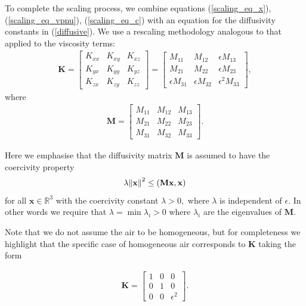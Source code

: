 \documentclass[12pt]{report}
\numberwithin{theorem}{chapter}
\numberwithin{corollary}{chapter}
\numberwithin{lemma}{chapter}
\numberwithin{remark}{chapter}
\numberwithin{definition}{chapter}
\numberwithin{prop}{chapter}
\begin{document}
To complete the scaling process, we combine equations (\ref{scaling_eq_x}), (\ref{scaling_eq_vpnu}), (\ref{scaling_eq_c}) with an equation for the diffusivity constants in (\ref{diffusive}). We use a rescaling methodology analogous to that applied to the viscosity terms:
%
\begin{gather}\label{scaling_eq_diffusion_gfc}
\mathbf{K}
=
 \begin{bmatrix} K_{xx} & K_{xy} & K_{xz} \\ K_{yx} & K_{yy} & K_{yz} \\ K_{zx} & K_{zy} & K_{zz} \end{bmatrix}
 =
  \begin{bmatrix}
    M_{11} & M_{12} & \epsilon M_{13} \\ M_{21} & M_{22} & \epsilon M_{23} \\ \epsilon M_{31} & \epsilon M_{32} & \epsilon^2 M_{33}
  \end{bmatrix},
\end{gather}
%
where
%
\begin{gather}
 \mathbf{M}
 =
  \begin{bmatrix}
    M_{11} & M_{12} & M_{13} \\ M_{21} & M_{22} & M_{23} \\ M_{31} & M_{32} & M_{33}
  \end{bmatrix}.
\end{gather}

Here we emphasise that the diffusivity matrix $\mathbf{M}$ is assumed to have the coercivity property
%
\begin{equation} \label{coercivity}
  \lambda \norm{\mathbf{x}}^2 \leq (\mathbf{M} \mathbf{x}, \mathbf{x})
\end{equation}
%
for all $\mathbf{x} \in \mathbb{R}^3$ with the coercivity constant $\lambda > 0,$ where $\lambda$ is independent of $\epsilon.$ In other words we require that $\lambda = \min {\lambda_i} > 0$ where $\lambda_i$ are the eigenvalues of $\mathbf{M}.$

Note that we do not assume the air to be homogeneous, but for completeness we highlight that the specific case of homogeneous air corresponds to $\mathbf{K}$ taking the form

\begin{gather} \nonumber
 \mathbf{K}
 =
  \begin{bmatrix}
    1 & 0 & 0 \\ 0 & 1 & 0 \\ 0 & 0 & \epsilon^2
  \end{bmatrix}.
\end{gather}
\end{document}
